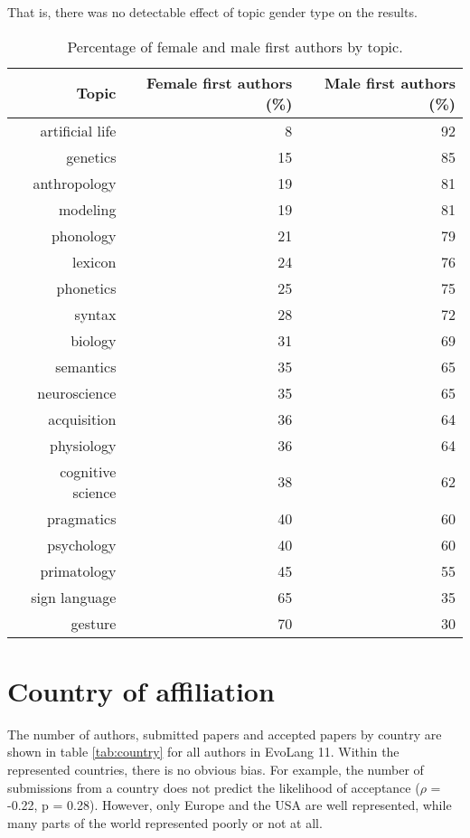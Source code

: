 \documentclass[12pt]{article}
\begin{document}
That is, there was no detectable effect of topic gender type on the results.

\begin{table}[ht]
\caption{Percentage of female and male first authors by topic.}
\centering
\begin{tabular}{rrr}
  \hline
Topic & Female first authors (\%) & Male first authors (\%) \\ 
  \hline
 artificial life &   8 &  92 \\ 
  genetics &  15 &  85 \\ 
  anthropology &  19 &  81 \\ 
  modeling &  19 &  81 \\ 
  phonology &  21 &  79 \\ 
  lexicon &  24 &  76 \\ 
  phonetics &  25 &  75 \\ 
  syntax &  28 &  72 \\ 
  biology &  31 &  69 \\ 
  semantics &  35 &  65 \\ 
  neuroscience &  35 &  65 \\ 
  acquisition &  36 &  64 \\ 
  physiology &  36 &  64 \\ 
  cognitive science &  38 &  62 \\ 
  pragmatics &  40 &  60 \\ 
  psychology &  40 &  60 \\ 
  primatology &  45 &  55 \\ 
  sign language &  65 &  35 \\ 
  gesture &  70 &  30 \\ 
   \hline
\end{tabular}
\label{tab:topics}
\end{table}

\section{Country of affiliation}

The number of authors, submitted papers and accepted papers by country are shown in table \ref{tab:country} for all authors in EvoLang 11.  Within the represented countries, there is no obvious bias.  For example, the number of submissions from a country does not predict the likelihood of acceptance ($\rho$ = -0.22, p = 0.28).  However, only Europe and the USA are well represented, while many parts of the world represented poorly or not at all.  
\end{document}
